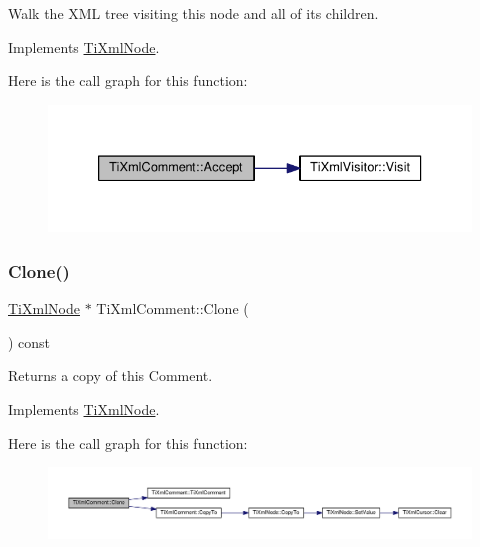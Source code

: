 Walk the X\+ML tree visiting this node and all of its children. 

Implements \hyperlink{class_ti_xml_node_acc0f88b7462c6cb73809d410a4f5bb86}{Ti\+Xml\+Node}.

Here is the call graph for this function\+:\nopagebreak
\begin{figure}[H]
\begin{center}
\leavevmode
\includegraphics[width=333pt]{class_ti_xml_comment_ac894241530d1d266131a5026cb251a95_cgraph}
\end{center}
\end{figure}
\mbox{\label{class_ti_xml_comment_a1f9f06e2ed3f77875093436193b16c16}} 
\subsubsection{\texorpdfstring{Clone()}{Clone()}}
{\footnotesize\ttfamily \hyperlink{class_ti_xml_node}{Ti\+Xml\+Node} $\ast$ Ti\+Xml\+Comment\+::\+Clone (\begin{DoxyParamCaption}{ }\end{DoxyParamCaption}) const\hspace{0.3cm}{\ttfamily [virtual]}}



Returns a copy of this Comment. 



Implements \hyperlink{class_ti_xml_node_a4508cc3a2d7a98e96a54cc09c37a78a4}{Ti\+Xml\+Node}.

Here is the call graph for this function\+:\nopagebreak
\begin{figure}[H]
\begin{center}
\leavevmode
\includegraphics[width=350pt]{class_ti_xml_comment_a1f9f06e2ed3f77875093436193b16c16_cgraph}
\end{center}
\end{figure}
\mbox{\label{class_ti_xml_comment_aaeb8a0b2d503f603879a2d04ceb54295}} 
